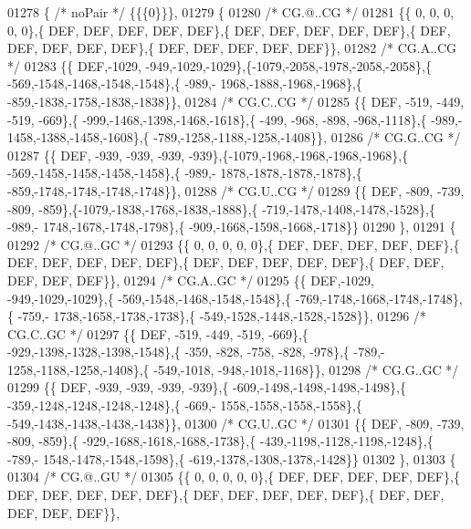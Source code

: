 \begin{DoxyCode}
01278 \{ \textcolor{comment}{/* noPair */} \{\{\{0\}\}\},
01279 \{
01280 \textcolor{comment}{/* CG.@..CG */}
01281 \{\{    0,    0,    0,    0,    0\},\{  DEF,  DEF,  DEF,  DEF,  DEF\},\{  DEF,  DEF,  DEF,  DEF,  DEF\},\{  DEF,  
      DEF,  DEF,  DEF,  DEF\},\{  DEF,  DEF,  DEF,  DEF,  DEF\}\},
01282 \textcolor{comment}{/* CG.A..CG */}
01283 \{\{  DEF,-1029, -949,-1029,-1029\},\{-1079,-2058,-1978,-2058,-2058\},\{ -569,-1548,-1468,-1548,-1548\},\{ -989,-
      1968,-1888,-1968,-1968\},\{ -859,-1838,-1758,-1838,-1838\}\},
01284 \textcolor{comment}{/* CG.C..CG */}
01285 \{\{  DEF, -519, -449, -519, -669\},\{ -999,-1468,-1398,-1468,-1618\},\{ -499, -968, -898, -968,-1118\},\{ -989,-
      1458,-1388,-1458,-1608\},\{ -789,-1258,-1188,-1258,-1408\}\},
01286 \textcolor{comment}{/* CG.G..CG */}
01287 \{\{  DEF, -939, -939, -939, -939\},\{-1079,-1968,-1968,-1968,-1968\},\{ -569,-1458,-1458,-1458,-1458\},\{ -989,-
      1878,-1878,-1878,-1878\},\{ -859,-1748,-1748,-1748,-1748\}\},
01288 \textcolor{comment}{/* CG.U..CG */}
01289 \{\{  DEF, -809, -739, -809, -859\},\{-1079,-1838,-1768,-1838,-1888\},\{ -719,-1478,-1408,-1478,-1528\},\{ -989,-
      1748,-1678,-1748,-1798\},\{ -909,-1668,-1598,-1668,-1718\}\}
01290 \},
01291 \{
01292 \textcolor{comment}{/* CG.@..GC */}
01293 \{\{    0,    0,    0,    0,    0\},\{  DEF,  DEF,  DEF,  DEF,  DEF\},\{  DEF,  DEF,  DEF,  DEF,  DEF\},\{  DEF,  
      DEF,  DEF,  DEF,  DEF\},\{  DEF,  DEF,  DEF,  DEF,  DEF\}\},
01294 \textcolor{comment}{/* CG.A..GC */}
01295 \{\{  DEF,-1029, -949,-1029,-1029\},\{ -569,-1548,-1468,-1548,-1548\},\{ -769,-1748,-1668,-1748,-1748\},\{ -759,-
      1738,-1658,-1738,-1738\},\{ -549,-1528,-1448,-1528,-1528\}\},
01296 \textcolor{comment}{/* CG.C..GC */}
01297 \{\{  DEF, -519, -449, -519, -669\},\{ -929,-1398,-1328,-1398,-1548\},\{ -359, -828, -758, -828, -978\},\{ -789,-
      1258,-1188,-1258,-1408\},\{ -549,-1018, -948,-1018,-1168\}\},
01298 \textcolor{comment}{/* CG.G..GC */}
01299 \{\{  DEF, -939, -939, -939, -939\},\{ -609,-1498,-1498,-1498,-1498\},\{ -359,-1248,-1248,-1248,-1248\},\{ -669,-
      1558,-1558,-1558,-1558\},\{ -549,-1438,-1438,-1438,-1438\}\},
01300 \textcolor{comment}{/* CG.U..GC */}
01301 \{\{  DEF, -809, -739, -809, -859\},\{ -929,-1688,-1618,-1688,-1738\},\{ -439,-1198,-1128,-1198,-1248\},\{ -789,-
      1548,-1478,-1548,-1598\},\{ -619,-1378,-1308,-1378,-1428\}\}
01302 \},
01303 \{
01304 \textcolor{comment}{/* CG.@..GU */}
01305 \{\{    0,    0,    0,    0,    0\},\{  DEF,  DEF,  DEF,  DEF,  DEF\},\{  DEF,  DEF,  DEF,  DEF,  DEF\},\{  DEF,  
      DEF,  DEF,  DEF,  DEF\},\{  DEF,  DEF,  DEF,  DEF,  DEF\}\},

\end{DoxyCode}
